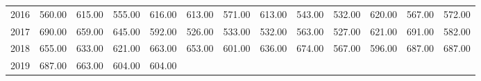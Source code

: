 \begin{longtable}{rrrrrrrrrrrrr}
  2016 & 560.00 & 615.00 & 555.00 & 616.00 & 613.00 & 571.00 & 613.00 & 543.00 & 532.00 & 620.00 & 567.00 & 572.00 \\ 
  2017 & 690.00 & 659.00 & 645.00 & 592.00 & 526.00 & 533.00 & 532.00 & 563.00 & 527.00 & 621.00 & 691.00 & 582.00 \\ 
  2018 & 655.00 & 633.00 & 621.00 & 663.00 & 653.00 & 601.00 & 636.00 & 674.00 & 567.00 & 596.00 & 687.00 & 687.00 \\ 
  2019 & 687.00 & 663.00 & 604.00 & 604.00 &  &  &  &  &  &  &  &  \\ 
   \hline
\hline
\end{longtable}
